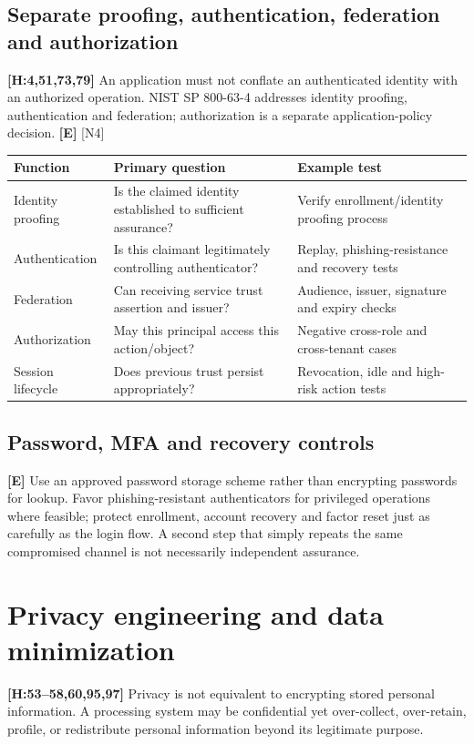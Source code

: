 \documentclass[10pt,letterpaper,oneside]{article}
\newcommand{\handbookref}[1]{\textsf{\color{accent}\textbf{[H:#1]}}}
\newcommand{\modernext}{\textsf{\color{muted}\textbf{[E]}}}
\begin{document}
\subsection{Separate proofing, authentication, federation and authorization}
\handbookref{4,51,73,79} An application must not conflate an authenticated identity with an authorized operation. NIST SP 800-63-4 addresses identity proofing, authentication and federation; authorization is a separate application-policy decision. \modernext{} [N4]
\par\medskip\noindent\begin{tabularx}{\textwidth}{@{}>{\raggedright\arraybackslash}p{}>{\raggedright\arraybackslash}X >{\raggedright\arraybackslash}X@{}}\toprule
Function & Primary question & Example test \\ \midrule
Identity proofing & Is the claimed identity established to sufficient assurance? & Verify enrollment/identity proofing process\\
Authentication & Is this claimant legitimately controlling authenticator? & Replay, phishing-resistance and recovery tests\\
Federation & Can receiving service trust assertion and issuer? & Audience, issuer, signature and expiry checks\\
Authorization & May this principal access this action/object? & Negative cross-role and cross-tenant cases\\
Session lifecycle & Does previous trust persist appropriately? & Revocation, idle and high-risk action tests\\
\bottomrule\end{tabularx}\par\medskip
\subsection{Password, MFA and recovery controls}\modernext{}
Use an approved password storage scheme rather than encrypting passwords for lookup. Favor phishing-resistant authenticators for privileged operations where feasible; protect enrollment, account recovery and factor reset just as carefully as the login flow. A second step that simply repeats the same compromised channel is not necessarily independent assurance.

\section{Privacy engineering and data minimization}
\handbookref{53--58,60,95,97} Privacy is not equivalent to encrypting stored personal information. A processing system may be confidential yet over-collect, over-retain, profile, or redistribute personal information beyond its legitimate purpose.
\end{document}
